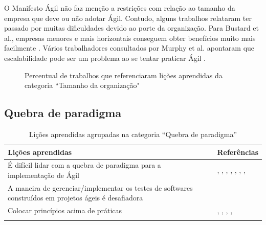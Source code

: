 O Manifesto Ágil não faz menção a restrições com relação ao tamanho da empresa que deve ou não adotar Ágil. Contudo, alguns trabalhos relataram ter passado por muitas dificuldades devido ao porte da organização. Para Bustard et al., empresas menores e mais horizontais conseguem obter benefícios muito mais facilmente \cite{Bustard2013}. Vários trabalhadores consultados por Murphy et al. apontaram que escalabilidade pode ser um problema ao se tentar praticar Ágil \cite{Microsoft2013}.

\begin{figure}[H]
	\centering
	\captionsetup{justification=centering}
	\caption{Percentual de trabalhos que referenciaram lições aprendidas da categoria ``Tamanho da organização"}
	\label{fig:tamanho}
\end{figure}

\subsection{Quebra de paradigma}

\begin{table}[H]
	\centering
	\captionsetup{justification=centering}
	\begin{tabularx}{\linewidth}{ | X | p{5cm} | } \hline \textbf{Lições aprendidas} & \textbf{Referências} \\ \hline
		É difícil lidar com a quebra de paradigma para a implementação de Ágil & \cite{Hajjdiab2011}, \cite{Block2011}, \cite{Korhonen2010}, \cite{Lapham2012}, \cite{Arikpo2011}, \cite{Stefano2013}, \cite{Bastos2013}, \cite{Maciel2013} \\ \hline
		A maneira de gerenciar/implementar os testes de softwares construídos em projetos ágeis é desafiadora & \cite{Korhonen2010} \\ \hline
		Colocar princípios acima de práticas & \cite{Maciel2013}, \cite{Parzinello2012}, \cite{Hui2013}, \cite{Ahmed2008}, \cite{Sahota2012} \\ \hline
	\caption{Lições aprendidas agrupadas na categoria ``Quebra de paradigma''}
	\end{tabularx}
\end{table}

